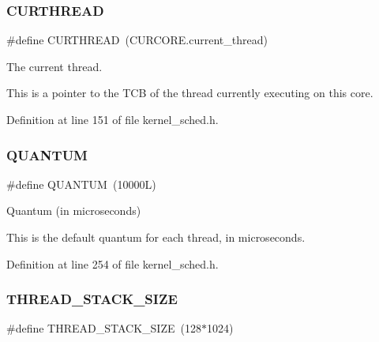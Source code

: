 \mbox{\label{group__scheduler_ga587a82c8931f0df72f43cc913ceb7e27}} 
\subsubsection{\texorpdfstring{C\+U\+R\+T\+H\+R\+E\+AD}{CURTHREAD}}
{\footnotesize\ttfamily \#define C\+U\+R\+T\+H\+R\+E\+AD~(C\+U\+R\+C\+O\+R\+E.\+current\+\_\+thread)}



The current thread. 

This is a pointer to the T\+CB of the thread currently executing on this core. 

Definition at line 151 of file kernel\+\_\+sched.\+h.

\mbox{\label{group__scheduler_gabc4f0f9abea1b5443308e4ea84b52b21}} 
\subsubsection{\texorpdfstring{Q\+U\+A\+N\+T\+UM}{QUANTUM}}
{\footnotesize\ttfamily \#define Q\+U\+A\+N\+T\+UM~(10000\+L)}



Quantum (in microseconds) 

This is the default quantum for each thread, in microseconds. 

Definition at line 254 of file kernel\+\_\+sched.\+h.

\mbox{\label{group__scheduler_ga90b7a8cb7bc3fdbd98014a3e15ee6e9a}} 
\subsubsection{\texorpdfstring{T\+H\+R\+E\+A\+D\+\_\+\+S\+T\+A\+C\+K\+\_\+\+S\+I\+ZE}{THREAD\_STACK\_SIZE}}
{\footnotesize\ttfamily \#define T\+H\+R\+E\+A\+D\+\_\+\+S\+T\+A\+C\+K\+\_\+\+S\+I\+ZE~(128$\ast$1024)}

